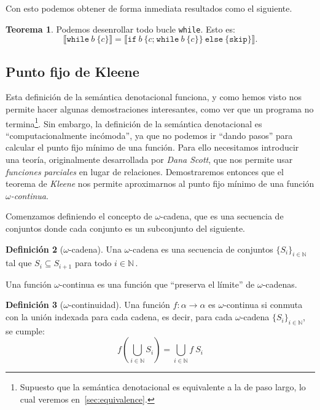 \documentclass[
  a4paper, 
  10pt, 
  parskip=half, 
  toc=bibliography,
]{scrbook}
\theoremstyle{definition}
\theoremstyle{bolddef}
\newtheorem{theorem}{Teorema}[section]
\newtheorem{definition}[theorem]{Definición}
\newcommand{\ImpIfElse}[3]{\texttt{if} \ {#1} \ \{{#2}\} \ \texttt{else} \ \{{#3}\}}
\newcommand{\ImpWhile}[2]{\texttt{while} \ {#1} \ \{{#2}\}}
\newcommand{\ImpConcat}[2]{{#1} \texttt{;} \ {#2}}
\newcommand{\ImpSkip}{\texttt{skip}}
\newcommand{\Denote}[1]{\llbracket{} {#1} \rrbracket{}}
\begin{document}
Con esto podemos obtener de forma inmediata resultados como el siguiente.

\begin{theorem}\label{thm:while_unroll_denote}
  Podemos desenrollar todo bucle \texttt{while}. Esto es:
  \[\Denote{\ImpWhile{b}{c}} = \Denote{\ImpIfElse{b}{\ImpConcat{c}{\ImpWhile{b}{c}}}{\ImpSkip}}.\]
\end{theorem}

\subsection{Punto fijo de Kleene}

Esta definición de la semántica denotacional funciona, y como hemos visto
nos permite hacer algunas demostraciones interesantes, como ver que un programa
no termina\footnote{Supuesto que la semántica denotacional es equivalente a la
  de paso largo, lo cual veremos en~\ref{sec:equivalence}.}.
Sin embargo, la definición de la semántica denotacional es 
\enquote{computacionalmente incómoda}, ya que no podemos ir \enquote{dando pasos}
para calcular el punto fijo mínimo de una función. Para ello necesitamos
introducir una teoría, originalmente desarrollada por \emph{Dana Scott}, que
nos permite usar \emph{funciones parciales} en lugar de relaciones.
Demostraremos entonces que el teorema de \emph{Kleene} nos permite
aproximarnos al punto fijo mínimo de una función \emph{\(\omega\)-continua}.

Comenzamos definiendo el concepto de \(\omega\)-cadena, que es una secuencia de
conjuntos donde cada conjunto es un subconjunto del siguiente.

\begin{definition}[\(\omega\)-cadena]
  Una \(\omega\)-cadena es una secuencia de conjuntos \({\{S_i\}}_{i \in \mathbb{N}}\) tal que
  \(S_i \subseteq S_{i+1}\) para todo \(i \in \mathbb{N}\,\).
\end{definition}

Una función \(\omega\)-continua es una función que \enquote{preserva el límite} de
\(\omega\)-cadenas.

\begin{definition}[\(\omega\)-continuidad]
  Una función \(f: \alpha \to \alpha\) es \(\omega\)-continua si conmuta con la unión
  indexada para cada cadena, es decir, para cada \(\omega\)-cadena \({\{S_i\}}_{i \in \mathbb{N}}\), se cumple:
  \[
    f \left( \bigcup_{i \in \mathbb{N}} S_i \right) = \bigcup_{i \in \mathbb{N}} f \ S_i
  \]
\end{definition}
\end{document}
